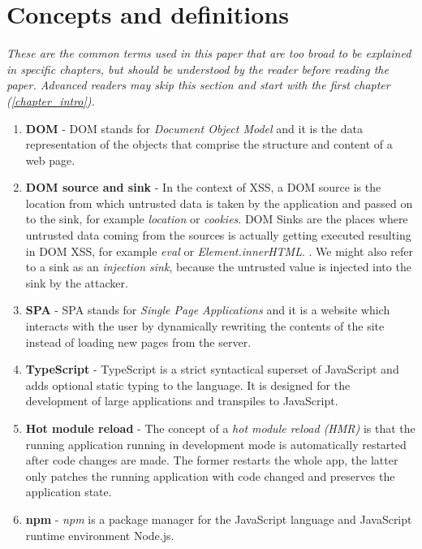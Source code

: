 \chapter*{Concepts and definitions} %
\label{definitions}

\textit{These are the common terms used in this paper that are too broad to be explained in specific
  chapters, but should be understood by the reader before reading the paper. Advanced readers may
  skip this section and start with the first chapter (\ref{chapter_intro}).}

\begin{enumerate}
  \item \label{def:dom} \textbf{DOM} - DOM stands for \emph{Document Object Model} and it is
        the data representation of the objects that comprise the structure and content of a web
        page.
  \item \label{def:dom_source_sink} \textbf{DOM source and sink} - In the context of XSS, a DOM
        source is the location from which untrusted data is taken by the application and passed on
        to the sink, for example \emph{location} or \emph{cookies}. DOM Sinks are the places where
        untrusted data coming from the sources is actually getting executed resulting in DOM XSS,
        for example \emph{eval} or \emph{Element.innerHTML}. \cite{source_sink_definition}. We might
        also refer to a sink as an \emph{injection sink}, because the untrusted value is injected
        into the sink by the attacker.
  \item \label{def:spa} \textbf{SPA} - SPA stands for \emph{Single Page Applications} and it
        is a website which interacts with the user by dynamically rewriting the contents of the site
        instead of loading new pages from the server.
  \item \label{def:ts} \textbf{TypeScript} - TypeScript is a strict syntactical superset of
        JavaScript and adds optional static typing to the language. It is designed for the
        development of large applications and transpiles to JavaScript.
  \item \label{def:hot_reload} \textbf{Hot module reload} - The concept of a \emph{hot module reload
          (HMR)} is that the running application running in development mode is automatically
        restarted after code changes are made. The former restarts the whole app, the latter only
        patches the running application with code changed and preserves the application state.
  \item \label{def:npm} \textbf{npm} - \emph{npm} is a package manager for the JavaScript
        language and JavaScript runtime environment Node.js.
\end{enumerate}
